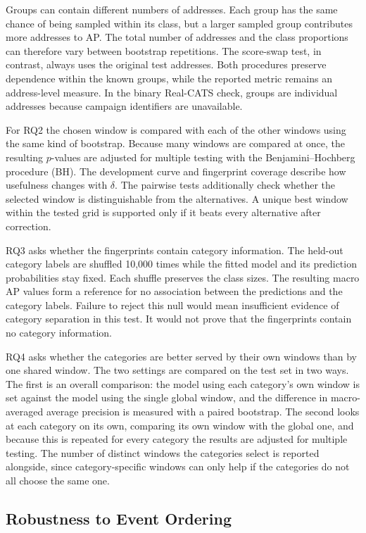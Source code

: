 \documentclass{thesisclass}
\begin{document}
Groups can contain different numbers of addresses. Each group has the same
chance of being sampled within its class, but a larger sampled group contributes
more addresses to AP. The total number of addresses and the class proportions
can therefore vary between bootstrap repetitions. The score-swap test, in
contrast, always uses the original test addresses. Both procedures preserve
dependence within the known groups, while the reported metric remains an
address-level measure. In the binary Real-CATS check, groups are individual
addresses because campaign identifiers are unavailable.

For RQ2 the chosen window is compared with each of the other windows using the
same kind of bootstrap. Because many windows are compared at once, the resulting
$p$-values are adjusted for multiple testing with the Benjamini--Hochberg
procedure (BH). The development curve and fingerprint coverage describe how
usefulness changes with $\delta$. The pairwise tests additionally check whether
the selected window is distinguishable from the alternatives. A unique best
window within the tested grid is supported only if it beats every alternative
after correction.

RQ3 asks whether the fingerprints contain category information. The held-out
category labels are shuffled 10{,}000 times while the fitted model and its
prediction probabilities stay fixed. Each shuffle preserves the class sizes.
The resulting macro AP values form a reference for no association between the
predictions and the category labels. Failure to reject this null would mean
insufficient evidence of category separation in this test. It would not prove
that the fingerprints contain no category information.

RQ4 asks whether the categories are better served by their own windows than by one
shared window. The two settings are compared on the test set in two ways. The first
is an overall comparison: the model using each category's own window is set against
the model using the single global window, and the difference in macro-averaged
average precision is measured with a paired bootstrap. The second looks at each
category on its own, comparing its own window with the global one, and because this
is repeated for every category the results are adjusted for multiple testing. The
number of distinct windows the categories select is reported alongside, since
category-specific windows can only help if the categories do not all choose the
same one.

\subsection{Robustness to Event Ordering}
\end{document}
